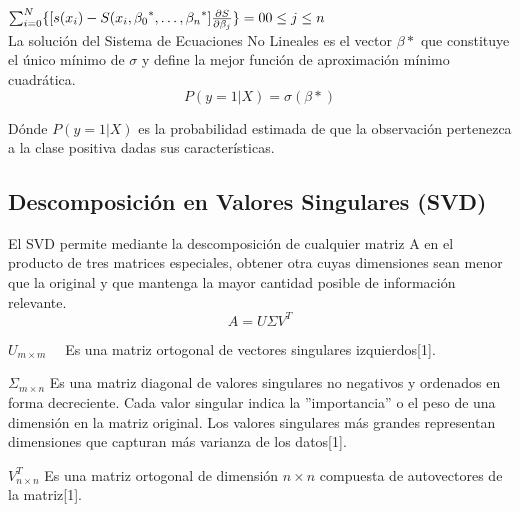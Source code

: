 \documentclass[a4paper,10pt,twocolumn]{article}
\begin{document}
 $\sum_{i=0}^{N} \{[s(x_i)-S(x_i,{\beta_0}^*,\dots,{\beta_n}^*]\frac{\partial S}{\partial \beta_j}\}= 0\\    0 \leq j \leq n$\\

 La solución del Sistema de Ecuaciones No Lineales es el vector $\beta*$ que constituye el único
mínimo de $\sigma$ y define la mejor función de aproximación mínimo cuadrática.\\
\[
P(y=1|X) =\sigma( \beta*)
\]

Dónde $P(y=1|X)$ es la probabilidad estimada de que la observación pertenezca a la clase positiva dadas sus características.
\subsection{Descomposición en Valores Singulares (SVD)}
El SVD permite mediante la descomposición de cualquier matriz A en el producto de tres matrices especiales, obtener otra cuyas dimensiones sean menor que la original y que mantenga la mayor cantidad posible de información relevante.
\[
    A = U \Sigma V^T
\]

\begin{description}
			\item $U_{m \times m} \quad$ Es una matriz ortogonal de vectores singulares izquierdos[1].
			\item $\Sigma_{m \times n}$ Es una matriz diagonal de valores singulares no negativos y ordenados en forma decreciente. Cada valor singular indica la ”importancia” o el peso de una dimensión en la matriz original. Los valores singulares más grandes representan dimensiones que capturan más varianza de los datos[1].
            \item $V^T_{n \times n}$ Es una matriz ortogonal de dimensión $n \times n$ compuesta de autovectores de la matriz[1].\\
		\end{description}
\end{document}
